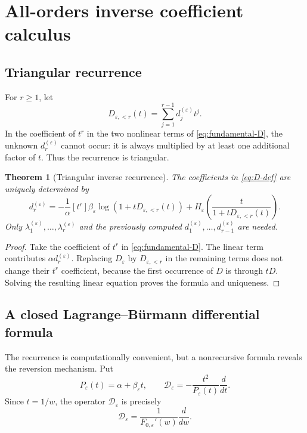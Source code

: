 \documentclass[11pt,a4paper]{article}
\theoremstyle{clean}
\newtheorem{theorem}{Theorem}[section]
\theoremstyle{definition}
\newcommand{\eps}{\varepsilon}
\newcommand{\al}{\alpha}
\newcommand{\be}{\beta}
\newcommand{\Coeff}[2]{\left[#1\right]#2}
\newcommand{\Dop}{\mathscr D}
\begin{document}
\section{All-orders inverse coefficient calculus}
\label{sec:inverse-coefficients}

\subsection{Triangular recurrence}

For \(r\ge1\), let
\begin{equation}
 D_{\eps,<r}(t)=\sum_{j=1}^{r-1}d_j^{(\eps)}t^j.
 \label{eq:D-less-r}
\end{equation}
In the coefficient of \(t^r\) in the two nonlinear terms of \cref{eq:fundamental-D}, the unknown \(d_r^{(\eps)}\) cannot occur: it is always multiplied by at least one additional factor of \(t\).  Thus the recurrence is triangular.

\begin{theorem}[Triangular inverse recurrence]
\label{thm:d-recurrence}
The coefficients in \cref{eq:D-def} are uniquely determined by
\begin{equation}
 \boxed{\displaystyle
 d_r^{(\eps)}=-\frac1\al\Coeff{t^r}{
 \be_\eps\log\!\left(1+tD_{\eps,<r}(t)\right)
 +H_\eps\!\left(\frac{t}{1+tD_{\eps,<r}(t)}\right)}.}
 \label{eq:d-recurrence}
\end{equation}
Only \(\lambda_1^{(\eps)},\ldots,\lambda_r^{(\eps)}\) and the previously computed \(d_1^{(\eps)},\ldots,d_{r-1}^{(\eps)}\) are needed.
\end{theorem}

\begin{proof}
Take the coefficient of \(t^r\) in \cref{eq:fundamental-D}.  The linear term contributes \(\al d_r^{(\eps)}\).  Replacing \(D_\eps\) by \(D_{\eps,<r}\) in the remaining terms does not change their \(t^r\) coefficient, because the first occurrence of \(D\) is through \(tD\).  Solving the resulting linear equation proves the formula and uniqueness.
\end{proof}

\subsection{A closed Lagrange--B\"urmann differential formula}

The recurrence is computationally convenient, but a nonrecursive formula reveals the reversion mechanism.  Put
\begin{equation}
 P_\eps(t)=\al+\be_\eps t,
 \qquad
 \Dop_\eps=-\frac{t^2}{P_\eps(t)}\frac{d}{dt}.
 \label{eq:P-Dop}
\end{equation}
Since \(t=1/w\), the operator \(\Dop_\eps\) is precisely
\begin{equation}
 \Dop_\eps=\frac1{F_{0,\eps}'(w)}\frac{d}{dw}.
 \label{eq:Dop-w}
\end{equation}
\end{document}
